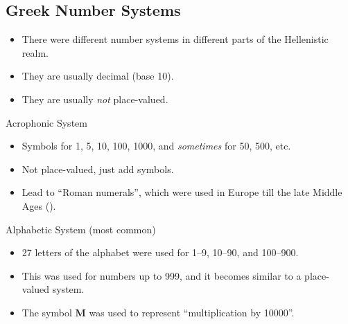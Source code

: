 \documentclass[class=article, crop=false]{standalone}
\begin{document}
  \subsection{Greek Number Systems}
  \begin{itemize}
    \item There were different number systems in different parts of the Hellenistic realm.
    \item They are usually decimal (base 10).
    \item They are usually \emph{not} place-valued.
  \end{itemize}
  \begin{example}{Acrophonic System}
    \begin{itemize}
      \item Symbols for 1, 5, 10, 100, 1000, and \emph{sometimes} for 50, 500, etc.
      \item Not place-valued, just add symbols.
      \item Lead to ``Roman numerals'', which were used in Europe till the late Middle Ages ().
    \end{itemize}
  \end{example}
  \begin{example}{Alphabetic System (most common)}
    \begin{itemize}
      \item 27 letters of the alphabet were used for 1--9, 10--90, and 100--900.
      \item This was used for numbers up to 999, and it becomes similar to a place-valued system.
      \item The symbol \textbf{M} was used to represent ``multiplication by 10000''.
    \end{itemize}
  \end{example}
\end{document}
